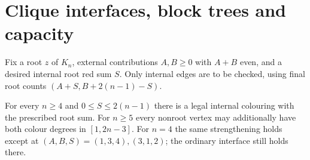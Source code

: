 \section{Clique interfaces, block trees and capacity}\label{sec:cliques}

Fix a root $z$ of $K_n$, external contributions $A,B\ge0$ with
$A+B$ even, and a desired internal root red sum $S$. Only internal
edges are to be checked, using final root counts
$(A+S,B+2(n-1)-S)$.

\begin{theorem}\label{thm:cliqueport}
For every $n\ge4$ and $0\le S\le2(n-1)$ there is a legal internal
colouring with the prescribed root sum. For $n\ge5$ every nonroot
vertex may additionally have both colour degrees in $[1,2n-3]$.
For $n=4$ the same strengthening holds except at
$(A,B,S)=(1,3,4),(3,1,2)$; the ordinary interface still holds there.
\end{theorem}
